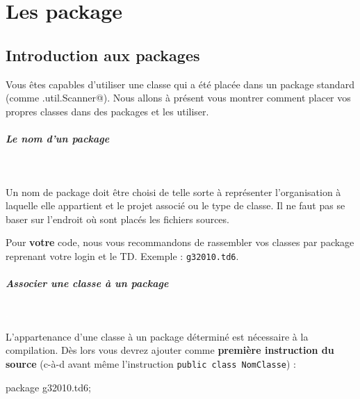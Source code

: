 \documentclass[11pt,a4paper]{article}
\begin{document}
            \section{Les package}\subsection{Introduction aux packages}
				Vous \^etes capables d'utiliser une classe
				qui a \'et\'e plac\'ee dans un package standard 
				(comme \verb@java.util.Scanner@).
				Nous allons \`a pr\'esent vous montrer
				comment placer vos propres classes dans des packages
				et les utiliser.
			
            \par
        
			
		\subparagraph{Le nom d'un package} 
		
					\textcolor{white}{.} \par
				
            \par
        
				Un nom de package doit \^etre choisi de telle sorte
				\`a repr\'esenter l'organisation \`a laquelle elle
				appartient et le projet associ\'e ou
				le type de classe.
				Il ne faut pas se baser sur l'endroit o\`u sont plac\'es 
				les fichiers sources.
			
            \par
        
				Pour \textbf{votre} code, 
				nous vous recommandons de rassembler vos classes
				par package reprenant votre login et le TD.
				Exemple : \verb|g32010.td6|. 
			
            \par
        
			
		\subparagraph{Associer une classe \`a un package} 
		
					\textcolor{white}{.} \par
				
            \par
        
				L'appartenance d'une classe \`a un package d\'etermin\'e est n\'ecessaire \`a la compilation. 
				D\`es lors vous devrez ajouter comme \textbf{premi\`ere instruction du source} 
				(c-\`a-d avant m\^eme l'instruction \verb|public class NomClasse|) :
			
            \par
        \begin{Java}
	package g32010.td6;
			\end{Java}
			
\end{document}
